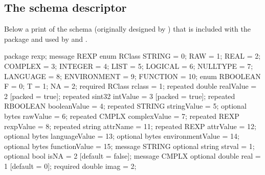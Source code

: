 \documentclass[article]{jss}
\begin{document}
\begin{appendix}

\section[The rexp.proto schema descriptor]{The  schema descriptor}
\label{rexp.proto}

Below a print of the  schema (originally designed by
\citealt{rhipe}) that is included with the  package and
used by  and .
%
\begin{CodeChunk}
\begin{CodeInput}
package rexp;
message REXP {
  enum RClass {
    STRING = 0;
    RAW = 1;
    REAL = 2;
    COMPLEX = 3;
    INTEGER = 4;
    LIST = 5;
    LOGICAL = 6;
    NULLTYPE = 7;
    LANGUAGE = 8;
    ENVIRONMENT = 9;
    FUNCTION = 10;
  }
  enum RBOOLEAN {
    F = 0;
    T = 1;
    NA = 2;
  }
  required RClass rclass = 1;
  repeated double realValue = 2 [packed = true];
  repeated sint32 intValue = 3 [packed = true];
  repeated RBOOLEAN booleanValue = 4;
  repeated STRING stringValue = 5;
  optional bytes rawValue = 6;
  repeated CMPLX complexValue = 7;
  repeated REXP rexpValue = 8;
  repeated string attrName = 11;
  repeated REXP attrValue = 12;
  optional bytes languageValue = 13;
  optional bytes environmentValue = 14;
  optional bytes functionValue = 15;
}
message STRING {
  optional string strval = 1;
  optional bool isNA = 2 [default = false];
}
message CMPLX {
  optional double real = 1 [default = 0];
  required double imag = 2;
}
\end{CodeInput}
\end{CodeChunk}

\end{appendix}
\end{document}

